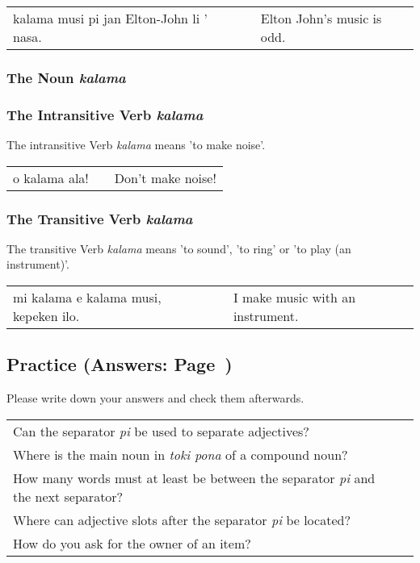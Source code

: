 \begin{supertabular}{p{5,5cm}|ll}
    kalama musi pi jan Elton-John li ' nasa. &  & Elton John's music is odd. \\
\end{supertabular}

\subsubsection*{The Noun \textit{kalama}}
\subsubsection*{The Intransitive Verb \textit{kalama}}
The intransitive Verb \textit{kalama} means 'to make noise'.

\begin{supertabular}{p{5,5cm}|ll}
    o kalama ala! &  & Don't make noise! \\
\end{supertabular}

\subsubsection*{The Transitive Verb \textit{kalama}}
The transitive Verb \textit{kalama} means 'to sound', 'to ring' or 'to play (an instrument)'.

\begin{supertabular}{p{5,5cm}|ll}
    mi kalama e kalama musi, kepeken ilo. &  & I make music with an instrument. \\
\end{supertabular}

\newpage

\subsection*{Practice (Answers: Page~\pageref{'pi'})}
Please write down your answers and check them afterwards.

\begin{supertabular}{p{5,5cm}|ll}
    Can the separator \textit{pi} be used to separate adjectives?                             &  & \\
    Where is the main noun in \textit{toki pona} of a compound noun?                          &  & \\
    How many words must at least be between the separator \textit{pi} and the next separator? &  & \\
    Where can adjective slots after the separator \textit{pi} be located?                     &  & \\
    How do you ask for the owner of an item?                                                  &  & \\
\end{supertabular}

